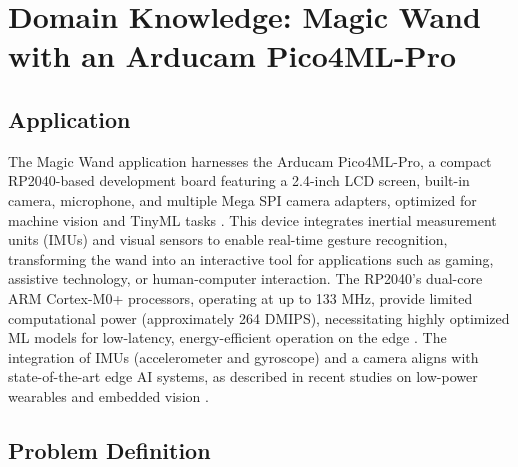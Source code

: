 %
%











\chapter{Domain Knowledge: Magic Wand with an Arducam Pico4ML-Pro}



\section{Application}

The Magic Wand application harnesses the Arducam Pico4ML-Pro, a compact RP2040-based development board featuring a 2.4-inch LCD screen, built-in camera, microphone, and multiple Mega SPI camera adapters, optimized for machine vision and TinyML tasks \cite{Arducam:2023}. This device integrates inertial measurement units (IMUs) and visual sensors to enable real-time gesture recognition, transforming the wand into an interactive tool for applications such as gaming, assistive technology, or human-computer interaction. The RP2040’s dual-core ARM Cortex-M0+ processors, operating at up to 133 MHz, provide limited computational power (approximately 264 DMIPS), necessitating highly optimized ML models for low-latency, energy-efficient operation on the edge \cite{rub:2022}. The integration of IMUs (accelerometer and gyroscope) and a camera aligns with state-of-the-art edge AI systems, as described in recent studies on low-power wearables and embedded vision \cite{Banerjee:2023, Vectornav:2021}.



\section{Problem Definition}

